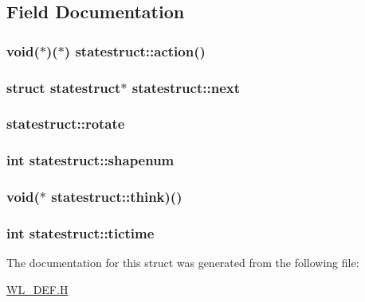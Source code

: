 \subsection{Field Documentation}
\hypertarget{structstatestruct_acdb59950009f4b7d145c3f3ac78d128a}{
\subsubsection[{action}]{\setlength{\rightskip}{0pt plus 5cm}void($\ast$)($\ast$) {\bf statestruct::action}()}}
\label{structstatestruct_acdb59950009f4b7d145c3f3ac78d128a}
\hypertarget{structstatestruct_a481b14f3f16765d8b63e6b686d9f93a7}{
\subsubsection[{next}]{\setlength{\rightskip}{0pt plus 5cm}struct {\bf statestruct}$\ast$ {\bf statestruct::next}}}
\label{structstatestruct_a481b14f3f16765d8b63e6b686d9f93a7}
\hypertarget{structstatestruct_a8651eb9411690280521886a1cc7aab79}{
\subsubsection[{rotate}]{ {\bf statestruct::rotate}}}
\label{structstatestruct_a8651eb9411690280521886a1cc7aab79}
\hypertarget{structstatestruct_adcf3b3300b91c9dd0100f73d7737ae36}{
\subsubsection[{shapenum}]{\setlength{\rightskip}{0pt plus 5cm}int {\bf statestruct::shapenum}}}
\label{structstatestruct_adcf3b3300b91c9dd0100f73d7737ae36}
\hypertarget{structstatestruct_abaed04e5bf2c478e07f96dec8f79e676}{
\subsubsection[{think}]{\setlength{\rightskip}{0pt plus 5cm}void($\ast$ {\bf statestruct::think})()}}
\label{structstatestruct_abaed04e5bf2c478e07f96dec8f79e676}
\hypertarget{structstatestruct_ae04354cebc5efa782154f4112a7fb08a}{
\subsubsection[{tictime}]{\setlength{\rightskip}{0pt plus 5cm}int {\bf statestruct::tictime}}}
\label{structstatestruct_ae04354cebc5efa782154f4112a7fb08a}


The documentation for this struct was generated from the following file:\begin{DoxyCompactItemize}
\item 
\hyperlink{WL__DEF_8H}{WL\_\-DEF.H}\end{DoxyCompactItemize}
